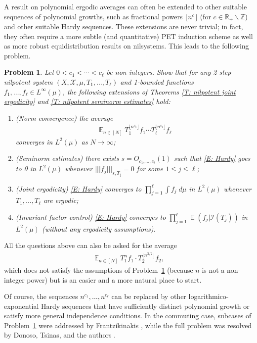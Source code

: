 \documentclass[11pt]{amsart}
\newtheorem{problem}{Problem}
\theoremstyle{definition}
\DeclareMathOperator*{\E}{\mathbb{E}}
\newcommand{\R}{{\mathbb R}}
\newcommand{\Z}{{\mathbb Z}}
\newcommand{\CI}{{\mathcal I}}
\newcommand{\CX}{{\mathcal X}}
\newcommand{\nnorm}[1]{\lvert\!|\!| #1|\!|\!\rvert}
\newcommand{\1}{{\mathbf{1}}}
\newcommand{\sfloor}[1]{{\lfloor #1 \rfloor}}
\begin{document}
A result on polynomial ergodic averages can often be extended to other suitable sequences of polynomial growths, such as fractional powers $\sfloor{n^c}$ (for $c\in\R_+\backslash\Z$) and other suitable Hardy sequences. These extensions are never trivial; in fact, they often require a more subtle (and quantitative) PET induction scheme as well as more robust equidistribution results on nilsystems. This leads to the following problem.
\begin{problem}\label{Pr: Hardy}
    Let $0< c_1 < \cdots < c_\ell$ be non-integers. Show that for any 2-step nilpotent system $(X, \CX, \mu, T_1, \ldots, T_\ell)$ and 1-bounded functions $f_1, \ldots, f_\ell\in L^\infty(\mu)$, the following extensions of Theorems \ref{T: nilpotent joint ergodicity} and \ref{T: nilpotent seminorm estimates} hold:
    \begin{enumerate}
        \item (Norm convergence) the average
        \begin{align}\label{E: Hardy}
            \E_{n\in [N]}T_1^{\sfloor{n^{c_1}}}f_1\cdots T_\ell^{\sfloor{n^{c_1}}} f_\ell
        \end{align}
        converges in $L^2(\mu)$ as $N\to\infty$;
        \item (Seminorm estimates) there exists $s = O_{c_1, \ldots, c_\ell}(1)$ such that \eqref{E: Hardy} goes to 0 in $L^2(\mu)$ whenever $\nnorm{f_j}_{s,T_j}= 0$ for some $1\leq j\leq \ell$;
        \item (Joint ergodicity) \eqref{E: Hardy} converges to $\prod_{j=1}^\ell \int f_j\; d\mu$ in $L^2(\mu)$ whenever $T_1, \ldots, T_\ell$ are ergodic;
        \item (Invariant factor control) \eqref{E: Hardy} converges to $\prod_{j=1}^\ell \E(f_j|\CI(T_j))$ in $L^2(\mu)$ (without any ergodicity assumptions).
    \end{enumerate}
\end{problem}
All the questions above can also be asked for the average
\begin{align*}
    \E_{n\in[N]}T_1^n f_1\cdot T_2^{\sfloor{n^{3/2}}}f_2,
\end{align*}
 which does not satisfy the assumptions of Problem~\ref{Pr: Hardy} (because $n$ is not a non-integer power) but is an easier and a more natural place to start.

Of course, the sequences $n^{c_1}, \ldots, n^{c_\ell}$ can be replaced by other logarithmico-exponential Hardy sequences that have sufficiently distinct {polynomial} growth or satisfy more general independence conditions.  In the commuting case, subcases of Problem~\ref{Pr: Hardy} were addressed by Frantzikinakis \cite{Fr12}, while the full problem was resolved by Donoso, Tsinas, and the authors \cite{DKKST24}. 
\end{document}
